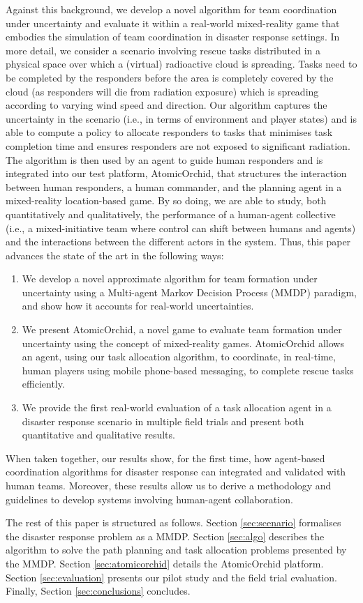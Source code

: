 Against this background, we develop a novel algorithm for team coordination under uncertainty and evaluate it within a real-world mixed-reality game that embodies the simulation of team coordination in disaster response settings. In more detail, we consider a scenario involving rescue tasks distributed in a physical space over which a (virtual) radioactive cloud is spreading. Tasks need to be completed by the responders before the area is completely covered by the cloud (as responders will die from radiation exposure) which is spreading according to varying wind speed and direction. Our algorithm captures the uncertainty in the scenario (i.e., in terms of environment and player states) and  is able to compute a policy to allocate responders to tasks that minimises task completion time and ensures responders are not exposed to significant radiation. The algorithm is then used by an agent to guide human responders and is  integrated  into our test platform, AtomicOrchid, that structures the interaction between human responders, a human commander, and the planning agent in a mixed-reality location-based game. By so doing, we are able to study, both quantitatively and qualitatively, the performance of a human-agent collective (i.e., a mixed-initiative team where control can shift between humans and agents)  and the interactions between the different actors in the system. Thus, this paper advances the state of the art in the following ways:
\begin{enumerate}
\item We develop a novel approximate algorithm for team formation under uncertainty using a Multi-agent Markov Decision Process (MMDP) paradigm, and show how it accounts for real-world uncertainties.
\item We present AtomicOrchid, a novel game to evaluate team formation under uncertainty using the concept of mixed-reality games. AtomicOrchid allows an agent, using our task allocation algorithm, to coordinate, in real-time, human players using mobile phone-based messaging, to complete rescue tasks efficiently.
\item We provide the first real-world evaluation of a task allocation agent in a disaster response scenario in multiple field trials and present both quantitative and qualitative results. 
\end{enumerate}
When taken together, our results show, for the first time, how agent-based coordination algorithms for disaster response can integrated and validated with human teams. Moreover, these results allow us to derive a methodology and guidelines to develop systems involving  human-agent collaboration. 

The rest of this paper is structured as follows. Section \ref{sec:scenario} formalises the disaster response problem as a MMDP. Section \ref{sec:algo}  describes the algorithm to solve the path planning and task allocation problems presented by the MMDP. Section \ref{sec:atomicorchid}  details the AtomicOrchid platform. Section \ref{sec:evaluation} presents our pilot study and the  field trial evaluation.  Finally, Section \ref{sec:conclusions} concludes.
